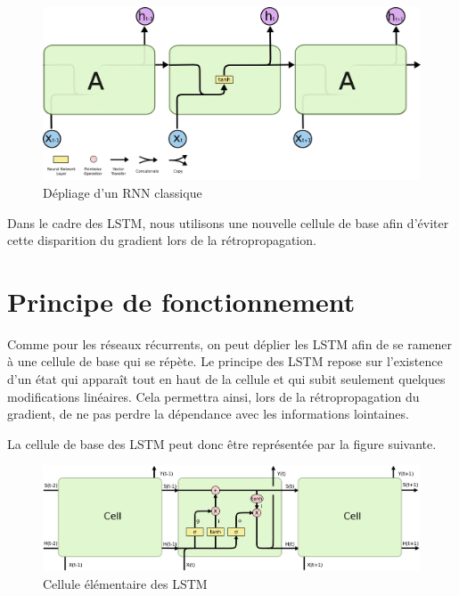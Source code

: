 \documentclass{report}
\theoremstyle{plain}
\theoremstyle{definition}
\theoremstyle{remark}
\begin{document}
\begin{figure}[h!]
\begin{center}
\includegraphics[scale=0.25]{images/RNN_classique.png}
\caption{Dépliage d'un RNN classique}
\label{RNN classique}
\end{center}
\end{figure}

Dans le cadre des LSTM, nous utilisons une nouvelle cellule de base afin d'éviter cette disparition du gradient lors de la rétropropagation.

\newpage

\section{Principe de fonctionnement}
Comme pour les réseaux récurrents, on peut déplier les LSTM afin de se ramener à une cellule de base qui se répète. Le principe des LSTM repose sur l'existence d'un état qui apparaît tout en haut de la cellule et qui subit seulement quelques modifications linéaires. Cela permettra ainsi, lors de la rétropropagation du gradient, de ne pas perdre la dépendance avec les informations lointaines.

La cellule de base des LSTM peut donc être représentée par la figure suivante.

\begin{figure}[h!]
\begin{center}
\includegraphics[scale=0.12]{images/LSTM_article_plusieurscell.png}
\caption{Cellule élémentaire des LSTM}
\label{cellule LSTM}
\end{center}
\end{figure}
\end{document}
